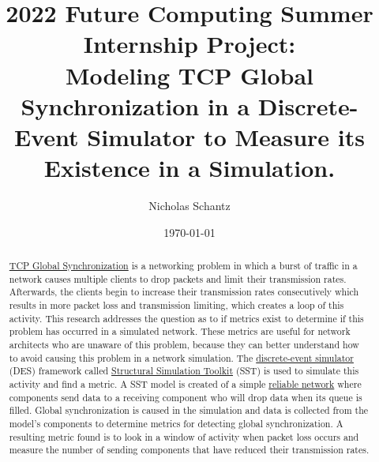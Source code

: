 \documentclass{article}
\begin{document}
    \begin{minipage}[h]{\textwidth}
        \title{2022 Future Computing Summer Internship Project:\\Modeling TCP Global Synchronization in a Discrete-Event Simulator to Measure its Existence in a Simulation.}
        \author{Nicholas Schantz}
        \date{\today}
            \maketitle
        \begin{abstract}
            \href{https://en.wikipedia.org/wiki/TCP_global_synchronization}{TCP Global Synchronization} is a networking problem in which a burst of traffic in a network causes multiple clients to drop packets and limit their transmission rates. Afterwards, the clients begin to increase their transmission rates consecutively which results in more packet loss and transmission limiting, which creates a loop of this activity. This research addresses the question as to if metrics exist to determine if this problem has occurred in a simulated network. These metrics are useful for network architects who are unaware of this problem, because they can better understand how to avoid causing this problem in a network simulation. The \href{https://en.wikipedia.org/wiki/Discrete-event_simulation}{discrete-event simulator} (DES) framework called \href{http://sst-simulator.org/}{Structural Simulation Toolkit} (SST) is used to simulate this activity and find a metric. A SST model is created of a simple \href{https://en.wikipedia.org/wiki/Reliability_(computer_networking}{reliable network} where components send data to a receiving component who will drop data when its queue is filled. Global synchronization is caused in the simulation and data is collected from the model's components to determine metrics for detecting global synchronization. A resulting metric found is to look in a window of activity when packet loss occurs and measure the number of sending components that have reduced their transmission rates.

        \end{abstract}
    \end{minipage}

\ \\


\end{document}
